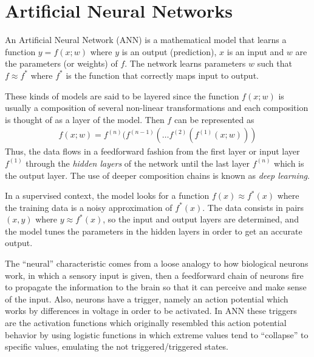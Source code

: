 \section{Artificial Neural Networks}

An Artificial Neural Network (ANN) is a mathematical model that learns a function $y = f(x;w)$ where $y$ is an output (prediction), $x$ is an input and $w$ are the parameters (or weights) of $f$. The network learns parameters $w$ such that $f\approx f^*$ where $f^*$ is the function that correctly maps input to output.

These kinds of models are said to be layered since the function $f(x; w)$ is usually a composition of several non-linear transformations and each composition is thought of as a layer of the model. Then $f$ can be represented as 
\begin{align}
    f(x;w) = f^{(n)}(f^{(n-1)}(\ldots f^{(2)} (f^{(1)}(x;w)))
    \label{eq:layers}
\end{align}
Thus, the data flows in a feedforward fashion from the first layer or input layer $f^{(1)}$ through the \textit{hidden layers} of the network until the last layer $f^{(n)}$ which is the output layer. The use of deeper composition chains is known as \textit{deep learning}.

In a supervised context, the model looks for a function $f(x) \approx f^*(x)$ where the training data is a noisy approximation of $f^*(x)$. The data consists in pairs $(x, y)$ where $y \approx f^*(x)$, so the input and output layers are determined, and the model tunes the parameters in the hidden layers in order to get an accurate output.

The “neural” characteristic comes from a loose analogy to how biological neurons work, in which a sensory input is given, then a feedforward chain of neurons fire to propagate the information to the brain so that it can perceive and make sense of the input. Also, neurons have a trigger, namely an action potential which works by differences in voltage in order to be activated. In ANN these triggers are the activation functions which originally resembled this action potential behavior by using logistic functions in which extreme values tend to “collapse” to specific values, emulating the not triggered/triggered states.

